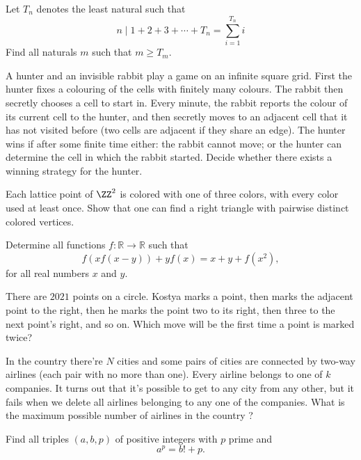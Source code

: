 \documentclass[11pt]{scrartcl}
\begin{document}
\begin{problem}[1918325703156767787]
Let $T_n$ denotes the least natural such that
$$n\mid 1+2+3+\cdots +T_n=\sum_{i=1}^{T_n} i$$Find all naturals $m$ such that $m\ge T_m$.

\end{problem}
\begin{problem}[3470579368412517052]
	A hunter and an invisible rabbit play a game on an infinite square grid. First the hunter fixes a colouring of the cells with finitely many colours. The rabbit then secretly chooses a cell to start in. Every minute, the rabbit reports the colour of its current cell to the hunter, and then secretly moves to an adjacent cell that it has not visited before (two cells are adjacent if they share an edge). The hunter wins if after some finite time either:
the rabbit cannot move; or
the hunter can determine the cell in which the rabbit started.
Decide whether there exists a winning strategy for the hunter.
\end{problem}
\begin{problem}[9187468721920084868]
  Each lattice point of $\ZZ^2$ is colored with one of three colors,
  with every color used at least once.
  Show that one can find a right triangle with pairwise distinct colored vertices.
\end{problem}
\begin{problem}[716406996122549]
Determine all functions $f: \mathbb{R} \rightarrow \mathbb{R}$ such that$$f(xf(x-y))+yf(x)=x+y+f(x^2),$$for all real numbers $x$ and $y.$
\end{problem}
\begin{problem}[4742951979457606021]
There are $2021$ points on a circle. Kostya marks a point, then marks the adjacent point to the right, then he marks the point two to its right, then three to the next point's right, and so on. Which move will be the first time a point is marked twice?
\end{problem}
\begin{problem}[697045850918084]
	In the country there're $N$ cities and some pairs of cities are connected by two-way airlines (each pair with no more than one). Every airline belongs to one of $k$ companies. It turns out that it's possible to get to any city from any other, but it fails when we delete all airlines belonging to any one of the companies. What is the maximum possible number of airlines in the country ?
\end{problem}
\begin{problem}[627600286851318227]
Find all triples $(a,b,p)$ of positive integers with $p$ prime and\[ a^p=b!+p. \]
\end{problem}
\end{document}

